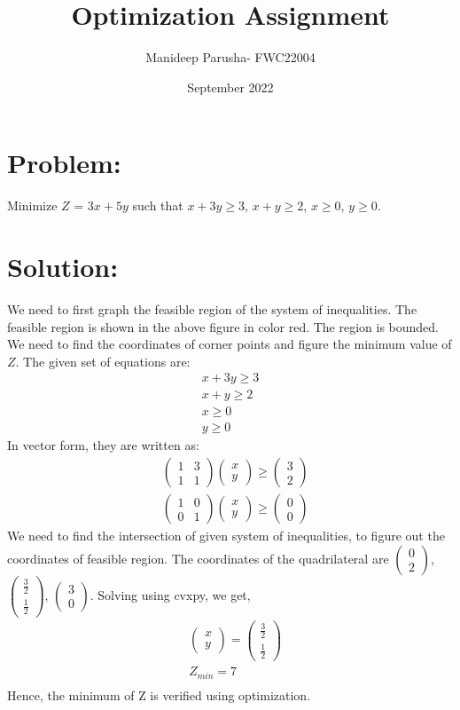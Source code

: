 \documentclass[a4paper,12pt,twocolumn]{article}
\title{Optimization Assignment}
\author{Manideep Parusha- FWC22004}
\date{September 2022}
\newcommand{\myvec}[1]{\ensuremath{\begin{pmatrix}#1\end{pmatrix}}}
\begin{document}
\maketitle
\section{Problem:}
Minimize $Z$ = $3x+5y$ such that $x+3y\ge3$, $x+y\ge2$, $x\ge0$, $y\ge0$.
\maketitle
\section{Solution:}
We need to first graph the feasible region of the system of inequalities. The feasible region is shown in the above figure in color red. The region is bounded. We need to find the coordinates of corner points and figure the minimum value of $Z$. The given set of equations are:
\begin{align}
	x+3y\ge3\\
	x+y\ge2\\
	x\ge0\\
	y\ge0
\end{align}
In vector form, they are written as:
\begin{align}
	&\myvec{1 & 3\\1&1}\myvec{x\\y}\ge\myvec{3\\2}\\
	&\myvec{1&0\\0&1}\myvec{x\\y}\ge\myvec{0\\0}
\end{align}
We need to find the intersection of given system of inequalities, to figure out the coordinates of feasible region.
The coordinates of the quadrilateral are $\myvec{0\\2}$, $\myvec{\frac{3}{2}\\\frac{1}{2}}$, $\myvec{3\\0}$.
Solving using cvxpy, we get,
\begin{align}
	&\myvec{x\\y} = \myvec{\frac{3}{2}\\\frac{1}{2}}\\
	&Z_{min} = 7\\
\end{align}
Hence, the minimum of Z is verified using optimization.
 
\end{document}
